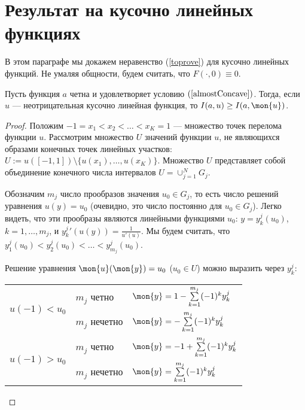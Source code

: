 \section{Результат на кусочно линейных функциях}

В этом параграфе мы докажем неравенство (\ref{toprove}) для кусочно линейных функций.
Не умаляя общности, будем считать, что $F(\cdot, 0) \equiv 0$.

\begin{theorem}
\label{linth}
Пусть функция $a$ четна и удовлетворяет условию $(\ref{almostConcave})$.
Тогда, если $u$ --- неотрицательная кусочно линейная функция, то $I(a, u) \ge I(a, \mon{u})$.
\end{theorem}

\begin{proof}
Положим $-1 = x_1 < x_2 < \dots < x_K = 1$ --- множество точек перелома функции $u$.
Рассмотрим множество $U$ значений функции $u$, не являющихся образами конечных точек
линейных участков: $U := u( [-1, 1] ) \setminus \{ u(x_1), \dots, u(x_K) \}$.
Множество $U$ представляет собой объединение конечного числа интервалов $U = \cup_{j = 1}^N G_j$.

Обозначим $m_j$ число прообразов значения $u_0 \in G_j$,
то есть число решений уравнения $u(y) = u_0$ 
(очевидно, это число постоянно для $u_0 \in G_j$).
Легко видеть, что эти прообразы являются линейными функциями $u_0$:
$y = y_k^j(u_0)$, $k = 1, \dots, m_j$,
и $y_k^j{}'(u(y)) = \frac{1}{u'(u)}$.
Мы будем считать, что $y_1^j(u_0) < y_2^j(u_0) < \dots < y_{m_j}^j(u_0)$.

Решение уравнения $\mon{u}(\mon{y})=u_0$ ($u_0 \in U$) можно выразить через $y_k^j$:

\begin{center}
\begin{tabular}{l|l|l} 
\multirow{2}{*}{$u(-1)<u_0$ \rule[-34pt]{0pt}{65pt}} & $m_j$ четно   & $\mon{y}=1-\sum\limits_{k=1}^{m_j} (-1)^k y_k^j$ \rule[-17pt]{0pt}{40pt} \\
                                                     & $m_j$ нечетно & $\mon{y}=-\sum\limits_{k=1}^{m_j} (-1)^k y_k^j$ \rule[-17pt]{0pt}{40pt} \\ \hline
\multirow{2}{*}{$u(-1)>u_0$ \rule[-34pt]{0pt}{65pt}} & $m_j$ четно   & $\mon{y}=-1+\sum\limits_{k=1}^{m_j} (-1)^k y_k^j$ \rule[-17pt]{0pt}{40pt} \\
                                                     & $m_j$ нечетно & $\mon{y}=\sum\limits_{k=1}^{m_j} (-1)^k y_k^j$ \rule[-17pt]{0pt}{40pt} \\
\end{tabular}
\end{center}


\end{proof}
